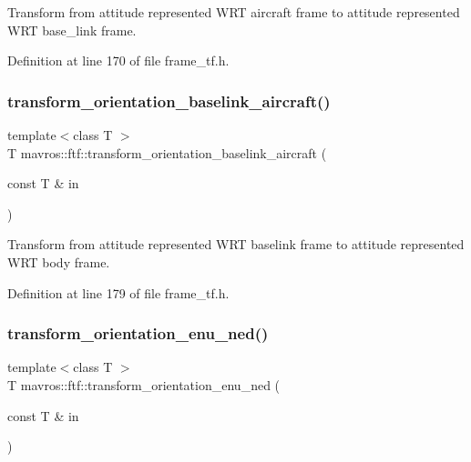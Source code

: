 Transform from attitude represented W\+RT aircraft frame to attitude represented W\+RT base\+\_\+link frame. 



Definition at line 170 of file frame\+\_\+tf.\+h.

\mbox{\label{group__nodelib_ga52af05306da40938392b1536064458af}} 
\subsubsection{\texorpdfstring{transform\_orientation\_baselink\_aircraft()}{transform\_orientation\_baselink\_aircraft()}}
{\footnotesize\ttfamily template$<$class T $>$ \\
T mavros\+::ftf\+::transform\+\_\+orientation\+\_\+baselink\+\_\+aircraft (\begin{DoxyParamCaption}\item[{const T \&}]{in }\end{DoxyParamCaption})\hspace{0.3cm}{\ttfamily [inline]}}



Transform from attitude represented W\+RT baselink frame to attitude represented W\+RT body frame. 



Definition at line 179 of file frame\+\_\+tf.\+h.

\mbox{\label{group__nodelib_ga60f73ab88fd56337bf2572fe696d1d04}} 
\subsubsection{\texorpdfstring{transform\_orientation\_enu\_ned()}{transform\_orientation\_enu\_ned()}}
{\footnotesize\ttfamily template$<$class T $>$ \\
T mavros\+::ftf\+::transform\+\_\+orientation\+\_\+enu\+\_\+ned (\begin{DoxyParamCaption}\item[{const T \&}]{in }\end{DoxyParamCaption})\hspace{0.3cm}{\ttfamily [inline]}}



